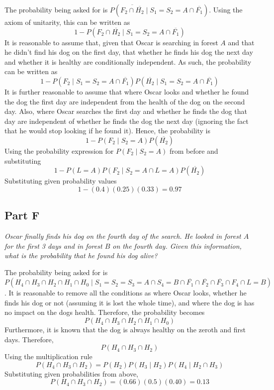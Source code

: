 \documentclass{article}
\begin{document}
The probability being asked for is $ P( \overline{F_2 \cap \overline{H_2}} \mid
S_1 = S_2 = A \cap \overline{F_1} ) $. Using the axiom of unitarity, this can be
written as
$$ 1 - P( F_2 \cap \overline{H_2} \mid S_1 = S_2 = A \cap \overline{F_1} ) $$
It is reasonable to assume that, given that Oscar is searching in forest $ A $
and that he didn't find his dog on the first day, that whether he finds his dog
the next day and whether it is healthy are conditionally independent. As such,
the probability can be written as
$$ 1 - P(F_2 \mid S_1 = S_2 = A \cap \overline{F_1}) P(\overline{H_2} \mid S_1 =
S_2 = A \cap \overline{F_1}) $$
It is further reasonable to assume that where Oscar looks and whether he found
the dog the first day are independent from the health of the dog on the second
day. Also, where Oscar searches the first day and whether he finds the dog that
day are independent of whether he finds the dog the next day (ignoring the fact
that he would stop looking if he found it). Hence, the probability is
$$ 1 - P(F_2 \mid S_2 = A) P(\overline{H_2}) $$
Using the probability expression for $ P(F_2 \mid S_2 = A) $ from before and
substituting
$$ 1 - P(L = A) P(F_2 \mid S_2 = A \cap L = A) P(\overline{H_2}) $$
Substituting given probability values
$$ 1 - (0.4) (0.25) (0.33) = 0.97 $$

\subsection*{Part F}

\textit{Oscar finally finds his dog on the fourth day of the search. He looked
in forest $ A $ for the first 3 days and in forest $ B $ on the fourth day.
Given this information, what is the probability that he found his dog alive?}

\bigbreak

The probability being asked for is $ P(H_4 \cap H_3 \cap H_2 \cap H_1 \cap H_0
\mid S_1 = S_2 = S_3 = A \cap S_4 = B \cap \overline{F_1} \cap \overline{F_2}
\cap \overline{F_3} \cap F_4 \cap L = B) $. It is reasonable to remove all the
conditions as where Oscar looks, whether he finds his dog or not (assuming it is
lost the whole time), and where the dog is has no impact on the dogs health.
Therefore, the probability becomes
$$ P(H_4 \cap H_3 \cap H_2 \cap H_1 \cap H_0) $$
Furthermore, it is known that the dog is always healthy on the zeroth and first
days. Therefore,
$$ P(H_4 \cap H_3 \cap H_2) $$
Using the multiplication rule
$$ P(H_4 \cap H_3 \cap H_2) = P(H_2) P(H_3 \mid H_2) P(H_4 \mid H_2 \cap H_3) $$
Substituting given probabilities from above,
$$ P(H_4 \cap H_3 \cap H_2) = (0.66) (0.5) (0.40) = 0.13 $$
\end{document}
